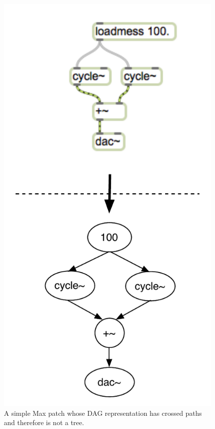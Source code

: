 \documentclass[a4paper,12pt]{report} 	%
\numberwithin{figure}{chapter}
\numberwithin{table}{chapter}
\numberwithin{equation}{chapter}
\begin{document}
\begin{flushleft}
\begin{figure}[h!]
\begin{center}
\includegraphics[scale=0.8]{MaxDAGsCrossedPaths}
\caption[A DAG with Crossed Paths]{A simple Max patch whose DAG representation has crossed paths and therefore is not a tree.}
\end{center}
\end{figure}
\\

\end{flushleft}
\end{document}
